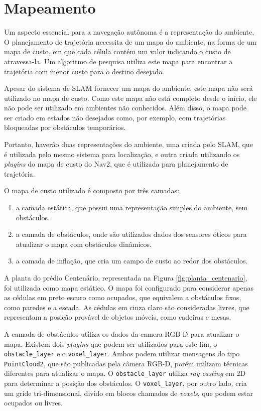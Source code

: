 \documentclass[repeatfields,xlists,xpacks,oneside,yearsonly]{ufrgscca}
\begin{document}
\section{Mapeamento}

Um aspecto essencial para a navegação autônoma é a representação do ambiente.
O planejamento de trajetória necessita de um mapa do ambiente, na forma
de um mapa de custo, em que cada célula contém um valor indicando o custo
de atravessa-la. Um algoritmo de pesquisa utiliza este mapa para encontrar
a trajetória com menor custo para o destino desejado.

Apesar do sistema de SLAM fornecer um mapa do ambiente, este mapa não será
utilizado no mapa de custo. Como este mapa não está completo desde o início,
ele não pode ser utilizado em ambientes não conhecidos. Além disso, o mapa
pode ser criado em estados não desejados como, por exemplo, com trajetórias
bloqueadas por obstáculos temporários.

Portanto, haverão duas representações do ambiente, uma criada pelo SLAM, que 
é utilizada pelo mesmo sistema para localização, e outra criada utilizando
os \textit{plugins} do mapa de custo do Nav2, que é utilizada para planejamento
de trajetória.

O mapa de custo utilizado é composto por três camadas: 
\begin{enumerate}
    \item a camada estática, que possui uma representação simples do ambiente,
     sem obstáculos.
    \item a camada de obstáculos, onde são utilizados dados dos sensores óticos
    para atualizar o mapa com obstáculos dinâmicos.
    \item a camada de inflação, que cria um campo de custo ao redor dos obstáculos.
\end{enumerate}

A planta do prédio Centenário, representada na Figura \ref{fig:planta_centenario},
foi utilizada como mapa estático. O mapa foi configurado para considerar apenas as 
cédulas em preto escuro como ocupados, que equivalem a obstáculos fixos, como paredes
e a escada. As cédulas em cinza claro são consideradas livres, que representam a posição 
provável de objetos móveis, como cadeiras e mesas.

A camada de obstáculos utiliza os dados da camera RGB-D para atualizar o mapa.
Existem dois \textit{plugins} que podem ser utilizados para este fim, o
\texttt{obstacle\_layer} e o \texttt{voxel\_layer}.
Ambos podem utilizar mensagens do tipo \texttt{PointCloud2}, que são publicadas
pela câmera RGB-D, porém utilizam técnicas diferentes para atualizar o mapa.
O \texttt{obstacle\_layer} utiliza \textit{ray casting} em 2D para 
determinar a posição dos obstáculos. 
O \texttt{voxel\_layer}, por outro lado, cria um gride tri-dimensional, 
divido em blocos chamados de \textit{voxels}, que podem estar ocupados ou livres.
\end{document}

